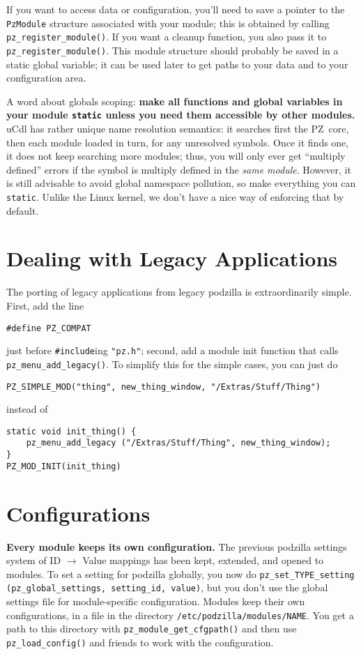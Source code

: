 \documentclass[12pt,letterpaper]{report}
\def\pz{{\footnotesize PZ}}
\begin{document}
If you want to access data or configuration, you'll need to save a pointer to the \verb|PzModule|
structure associated with your module; this is obtained by calling \verb|pz_register_module()|.
If you want a cleanup function, you also pass it to \verb|pz_register_module()|. This module
structure should probably be saved in a static global variable; it can be used later to get
paths to your data and to your configuration area.

A word about globals scoping: {\bf make all functions and global variables in your module
\verb|static| unless you need them accessible by other modules.}
uCdl has rather unique name resolution semantics: it searches first the \pz\ core, then each
module loaded in turn, for any unresolved symbols. Once it finds one, it does not keep searching
more modules; thus, you will only ever get ``multiply defined'' errors if the symbol is multiply
defined in the {\it same module}. However, it is still advisable to avoid global namespace pollution,
so make everything you can \verb|static|. Unlike the Linux kernel, we don't have a nice
way of enforcing that by default.

\section{Dealing with Legacy Applications}
The porting of legacy applications from legacy podzilla is extraordinarily simple. First, add the
line
\begin{verbatim}
#define PZ_COMPAT
\end{verbatim}
just before \verb|#include|ing \verb|"pz.h"|; second, add a module init function that calls
\verb|pz_menu_add_legacy()|. To simplify this for the simple cases, you can just do
\begin{verbatim}
PZ_SIMPLE_MOD("thing", new_thing_window, "/Extras/Stuff/Thing")
\end{verbatim}
instead of
\begin{verbatim}
static void init_thing() {
    pz_menu_add_legacy ("/Extras/Stuff/Thing", new_thing_window);
}
PZ_MOD_INIT(init_thing)
\end{verbatim}

\section{Configurations}
{\bf Every module keeps its own configuration.} The previous podzilla settings system of
ID $\to$ Value mappings has been kept, extended, and opened to modules. To set a setting
for podzilla globally, you now do \verb|pz_set_TYPE_setting (pz_global_settings, setting_id, value)|,
but you don't use the global settings file for module-specific configuration. Modules keep
their own configurations, in a file in the directory \verb|/etc/podzilla/|\hskip0pt\verb|modules/NAME|. You
get a path to this directory with \verb|pz_module_get_cfgpath()| and then use \verb|pz_load_config()|
and friends to work with the configuration.
\end{document}

